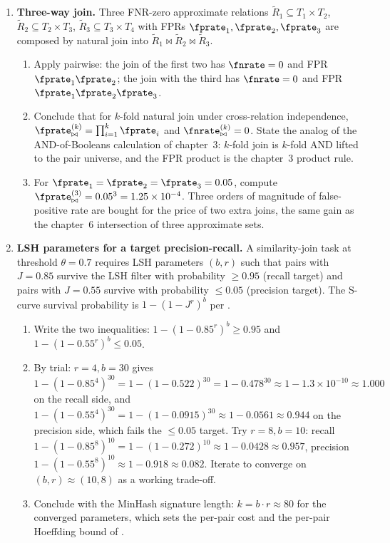 \begin{enumerate}
\item \exstarstar
\label{ex:ch12-6}
\textbf{Three-way join.}
Three FNR-zero approximate relations
$\tilde R_1 \subseteq T_1 \times T_2$,
$\tilde R_2 \subseteq T_2 \times T_3$,
$\tilde R_3 \subseteq T_3 \times T_4$
with FPRs $\fprate_1, \fprate_2, \fprate_3$ are composed by
natural join into $\tilde R_1 \bowtie \tilde R_2 \bowtie \tilde R_3$.
\begin{enumerate}
  \item[(a)] Apply  pairwise: the join of
    the first two has $\fnrate = 0$ and FPR $\fprate_1 \fprate_2$;
    the join with the third has $\fnrate = 0$ and FPR
    $\fprate_1 \fprate_2 \fprate_3$.
  \item[(b)] Conclude that for $k$-fold natural join under
    cross-relation independence, $\fprate_{\bowtie}^{(k)} =
    \prod_{i=1}^k \fprate_i$ and $\fnrate_{\bowtie}^{(k)} = 0$.
    State the analog of the AND-of-Booleans calculation of
    chapter~3: $k$-fold join is $k$-fold AND lifted to the pair
    universe, and the FPR product is the chapter~3 product rule.
  \item[(c)] For $\fprate_1 = \fprate_2 = \fprate_3 = 0.05$,
    compute $\fprate_{\bowtie}^{(3)} = 0.05^3 = 1.25 \times 10^{-4}$.
    Three orders of magnitude of false-positive rate are bought
    for the price of two extra joins, the same gain as the
    chapter~6 intersection of three approximate sets.
\end{enumerate}

\item \exstarstar
\label{ex:ch12-7}
\textbf{LSH parameters for a target precision-recall.}
A similarity-join task at threshold $\theta = 0.7$ requires LSH
parameters $(b, r)$ such that pairs with $J = 0.85$ survive the
LSH filter with probability $\ge 0.95$ (recall target) and pairs
with $J = 0.55$ survive with probability $\le 0.05$ (precision
target). The S-curve survival probability is $1 - (1 - J^r)^b$ per
.
\begin{enumerate}
  \item[(a)] Write the two inequalities:
    $1 - (1 - 0.85^r)^b \ge 0.95$ and $1 - (1 - 0.55^r)^b \le 0.05$.
  \item[(b)] By trial: $r = 4, b = 30$ gives $1 - (1 - 0.85^4)^{30}
    = 1 - (1 - 0.522)^{30} = 1 - 0.478^{30} \approx 1 -
    1.3 \times 10^{-10} \approx 1.000$ on the recall side, and
    $1 - (1 - 0.55^4)^{30} = 1 - (1 - 0.0915)^{30} \approx
    1 - 0.0561 \approx 0.944$ on the precision side, which fails
    the $\le 0.05$ target. Try $r = 8, b = 10$: recall
    $1 - (1 - 0.85^8)^{10} = 1 - (1 - 0.272)^{10} \approx 1 -
    0.0428 \approx 0.957$, precision $1 - (1 - 0.55^8)^{10}
    \approx 1 - 0.918 \approx 0.082$. Iterate to converge on
    $(b, r) \approx (10, 8)$ as a working trade-off.
  \item[(c)] Conclude with the MinHash signature length:
    $k = b \cdot r \approx 80$ for the converged parameters,
    which sets the per-pair cost and the per-pair Hoeffding bound
    of .
\end{enumerate}


\end{enumerate}
